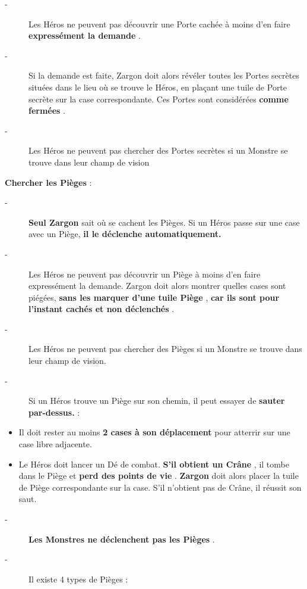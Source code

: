 \documentclass{scrartcl}%
\begin{document}
%
\begin{description}%
\item[{-} ]%
%
 Les Héros ne peuvent pas découvrir une Porte cachée à moins d'en faire %
\textbf{expressément la demande}%
.
%
\item[{-} ]%
%
 Si la demande est faite, Zargon doit alors révéler toutes les Portes secrètes situées dans le lieu où se trouve le Héros, en plaçant une tuile de Porte secrète sur la case correspondante. Ces Portes sont considérées %
\textbf{comme fermées}%
.
%
\item[{-} ]%
%
 Les Héros ne peuvent pas chercher des Portes secrètes si un Monstre se trouve dans leur champ de vision
%
\end{description}%
\textbf{Chercher les Pièges}%
:
%
\begin{description}%
\item[{-} ]%
%
\textbf{Seul Zargon}%
\textit{ }%
 sait où se cachent les Pièges. Si un Héros passe sur une case avec un Piège,%
\textbf{ il le déclenche automatiquement.}%

%
\item[{-} ]%
%
 Les Héros ne peuvent pas découvrir un Piège à moins d'en faire expressément la demande. Zargon doit alors montrer quelles cases sont piégées,%
\textbf{ sans les marquer d'une tuile Piège}%
, %
\textbf{car ils sont pour l'instant cachés et non déclenchés}%
.
%
\item[{-} ]%
%
 Les Héros ne peuvent pas chercher des Pièges si un Monstre se trouve dans leur champ de vision.
%
\item[{-} ]%
%
 Si un Héros trouve un Piège sur son chemin, il peut essayer de %
\textbf{sauter par{-}dessus.}%
\textit{ }%
 :
%
\end{description}%
\begin{itemize}%
\item%
%
 Il doit rester au moins%
\textbf{ 2 cases à son déplacement }%
pour atterrir sur une case libre adjacente.
%
\item%
%
 Le Héros doit lancer un Dé de combat. %
\textbf{S'il obtient un Crâne}%
, il tombe dans le Piège et %
\textbf{perd des points de vie}%
. %
\textbf{Zargon}%
\textit{ }%
 doit alors placer la tuile de Piège correspondante sur la case. S'il n'obtient pas de Crâne, il réussit son saut.
%
\end{itemize}%
\begin{description}%
\item[{-} ]%
%
\textbf{Les Monstres ne déclenchent pas les Pièges}%
.
%
\item[{-} ]%
%
 Il existe 4 types de Pièges :
%
\end{description}%
\end{document}

